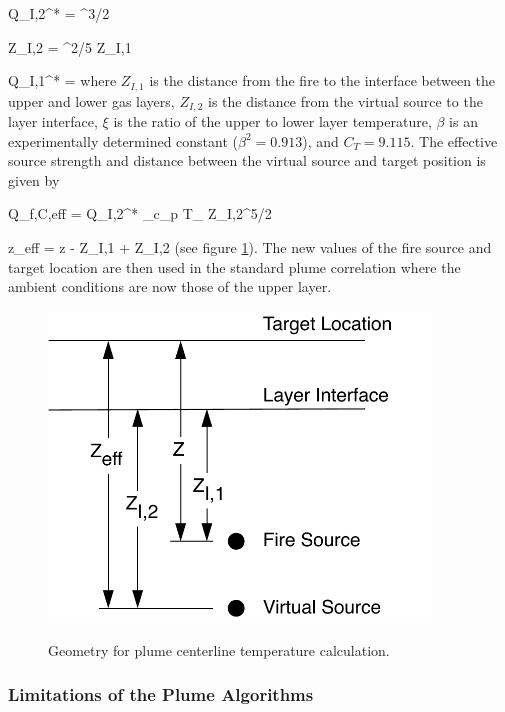 \be Q_{I,2}^* = ^{3/2} \ee

\be Z_{I,2} = ^{2/5} Z_{I,1}  \ee

\be Q_{I,1}^* =   \ee
where $Z_{I,1}$ is the distance from the fire to the interface between the upper and lower gas layers, $Z_{I,2}$ is the distance from the virtual source to the layer interface, $\xi$ is the ratio of the upper to lower layer temperature, $\beta$ is an experimentally determined constant \cite{Zukoski:1981} ($\beta^2 = 0.913$), and $C_T = 9.115$.  The effective source strength and distance between the virtual source and target position is given by

\be Q_{f,C,eff} = Q_{I,2}^* \rho_\infty c_{p\infty} T_\infty {} Z_{I,2}^{5/2}  \ee

\be z_{eff} = z - Z_{I,1} + Z_{I,2} \ee
(see figure \ref{fig:Plume_Temp_Notation}). The new values of the fire source and  target location are then used in the standard plume correlation where the ambient conditions are now those of the upper layer.
\begin{figure}
\begin{center}
\includegraphics[width=4.0in]{FIGURES/Theory/Plume_Temp_Notation}\\
\end{center}
\caption{Geometry for plume centerline temperature calculation.}
 \label{fig:Plume_Temp_Notation}
\end{figure}

\subsubsection{Limitations of the Plume Algorithms} \label{sec:plumelimits}

